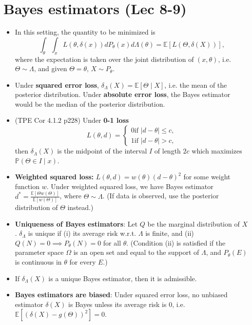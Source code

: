 \documentclass[twoside]{article}
\newcommand\bbE{\mathbb{E}}
\newcommand\bbP{\mathbb{P}}
\newcommand\dlt{\delta}
\newcommand\Lmb{\Lambda}
\newcommand\Om{\Omega}
\def\t{\theta}
\newcommand\T{\Theta}
\begin{document}
\section*{Bayes estimators (Lec 8-9)}
\begin{itemize}
\item In this setting, the quantity to be minimized is
\begin{equation*}
\int_\t \int_x L(\t, \dlt(x)) dP_\t(x) d\Lmb(\t) = \bbE [L(\T, \dlt(X))],
\end{equation*}
where the expectation is taken over the joint distribution of $(x, \t)$, i.e. $\T \sim \Lmb$, and given $\T = \t$, $X \sim P_\t$.

\item Under \textbf{squared error loss}, $\dlt_\Lmb (X) = \bbE [\T \mid X]$, i.e. the mean of the posterior distribution. Under \textbf{absolute error loss}, the Bayes estimator would be the median of the posterior distribution.

\item (TPE Cor 4.1.2 p228) Under \textbf{0-1 loss}
\[ L(\t, d) = \begin{cases} 0 \text{if } |d-\t| \leq c, \\ 1 \text{if } |d - \t| > c, \end{cases} \]
then $\dlt_\Lmb(X)$ is the midpoint of the interval $I$ of length $2c$ which maximizes $\bbP (\T \in I \mid x)$.

\item \textbf{Weighted squared loss:} $L(\t, d) = w(\t) (d-\t)^2$ for some weight function $w$. Under weighted squared loss, we have Bayes estimator $d^* = \displaystyle\frac{\bbE [\T w(\T)]}{\bbE [w(\T)]}$, where $\T \sim \Lmb$. (If data is observed, use the posterior distribution of $\T$ instead.)

\item \textbf{Uniqueness of Bayes estimators}: Let $Q$ be the marginal distribution of $X$. $\dlt_\Lmb$ is unique if (i) its average risk w.r.t. $\Lmb$ is finite, and (ii) $Q(N) = 0 \implies P_\t(N) = 0$ for all $\t$. (Condition (ii) is satisfied if the parameter space $\Om$ is an open set and equal to the support of $\Lmb$, and $P_\t(E)$ is continuous in $\t$ for every $E$.)

\item If $\dlt_\Lmb (X)$ is a unique Bayes estimator, then it is admissible.

\item \textbf{Bayes estimators are biased}: Under squared error loss, no unbiased estimator $\dlt(X)$ is Bayes unless its average risk is 0, i.e. $\bbE [(\dlt(X) - g(\T))^2] = 0$.

\end{itemize}
\end{document}
